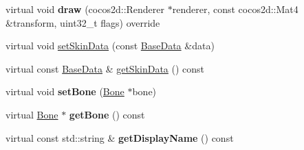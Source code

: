 \begin{DoxyCompactItemize}
virtual void {\bfseries draw} (cocos2d\+::\+Renderer $\ast$renderer, const cocos2d\+::\+Mat4 \&transform, uint32\+\_\+t flags) override
\item 
virtual void \hyperlink{classcocostudio_1_1Skin_af4d0ab0ecb523ce11215a32ade18fc05}{set\+Skin\+Data} (const \hyperlink{classcocostudio_1_1BaseData}{Base\+Data} \&data)
\item 
virtual const \hyperlink{classcocostudio_1_1BaseData}{Base\+Data} \& \hyperlink{classcocostudio_1_1Skin_a6014fbaaeca8af0a43b6ade364d4e50a}{get\+Skin\+Data} () const
\item 
\mbox{\label{classcocostudio_1_1Skin_a13cc6f9e31ad373551411f3d8d730371}} 
virtual void {\bfseries set\+Bone} (\hyperlink{classcocostudio_1_1Bone}{Bone} $\ast$bone)
\item 
\mbox{\label{classcocostudio_1_1Skin_ac7bbf84b6f0d0796ed5947e8494495ea}} 
virtual \hyperlink{classcocostudio_1_1Bone}{Bone} $\ast$ {\bfseries get\+Bone} () const
\item 
\mbox{\label{classcocostudio_1_1Skin_a24ed00df145371f6cf265b69891b44f6}} 
virtual const std\+::string \& {\bfseries get\+Display\+Name} () const
\end{DoxyCompactItemize}
